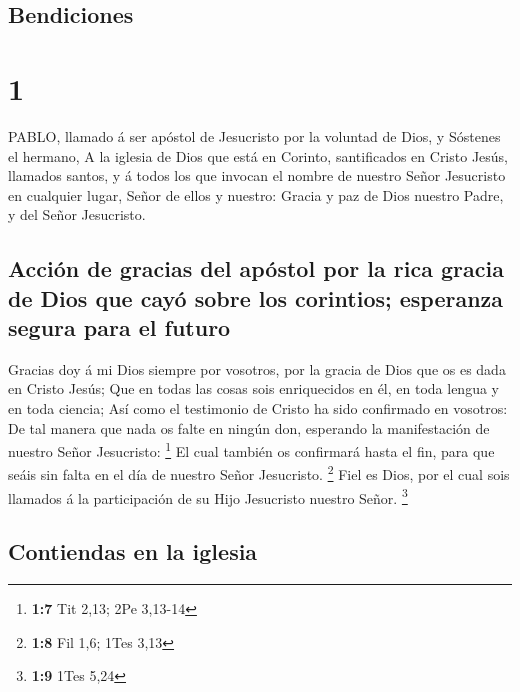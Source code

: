 \hypertarget{bendiciones}{%
\subsection{Bendiciones}\label{bendiciones}}

\hypertarget{section}{%
\section{1}\label{section}}

 PABLO, llamado á ser apóstol de Jesucristo por la voluntad
de Dios, y Sóstenes el hermano,  A la iglesia de Dios que
está en Corinto, santificados en Cristo Jesús, llamados santos, y á
todos los que invocan el nombre de nuestro Señor Jesucristo en cualquier
lugar, Señor de ellos y nuestro:  Gracia y paz de Dios
nuestro Padre, y del Señor Jesucristo.

\hypertarget{acciuxf3n-de-gracias-del-apuxf3stol-por-la-rica-gracia-de-dios-que-cayuxf3-sobre-los-corintios-esperanza-segura-para-el-futuro}{%
\subsection{Acción de gracias del apóstol por la rica gracia de Dios que
cayó sobre los corintios; esperanza segura para el
futuro}\label{acciuxf3n-de-gracias-del-apuxf3stol-por-la-rica-gracia-de-dios-que-cayuxf3-sobre-los-corintios-esperanza-segura-para-el-futuro}}

 Gracias doy á mi Dios siempre por vosotros, por la gracia
de Dios que os es dada en Cristo Jesús;  Que en todas las
cosas sois enriquecidos en él, en toda lengua y en toda ciencia;
 Así como el testimonio de Cristo ha sido confirmado en
vosotros:  De tal manera que nada os falte en ningún don,
esperando la manifestación de nuestro Señor Jesucristo: \footnote{\textbf{1:7}
  Tit 2,13; 2Pe 3,13-14}  El cual también os confirmará
hasta el fin, para que seáis sin falta en el día de nuestro Señor
Jesucristo. \footnote{\textbf{1:8} Fil 1,6; 1Tes 3,13}  Fiel
es Dios, por el cual sois llamados á la participación de su Hijo
Jesucristo nuestro Señor. \footnote{\textbf{1:9} 1Tes 5,24}

\hypertarget{contiendas-en-la-iglesia}{%
\subsection{Contiendas en la iglesia}\label{contiendas-en-la-iglesia}}

